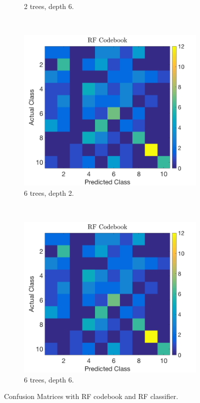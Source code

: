 \documentclass[a4paper, 10pt, conference]{ieeeconf}
\begin{document}
\begin{figure}[!ht]
\begin{subfigure}{0.45\linewidth}
      \caption{2 trees, depth 6.}
      \label{fig:rfrf2}
    \end{subfigure}
    \\
    \begin{subfigure}{0.45\linewidth}
      \includegraphics[width=\textwidth]{img/rfrf62}
      \caption{6 trees, depth 2.}
      \label{fig:rfrf3}
    \end{subfigure}
    ~
    \begin{subfigure}{0.45\linewidth}
      \includegraphics[width=\textwidth]{img/rfrf66}
      \caption{6 trees, depth 6.}
      \label{fig:rfrf4}
    \end{subfigure}

  \caption{Confusion Matrices with RF codebook and RF classifier.}
  \label{fig:rfrf}
\end{figure}
\end{document}
